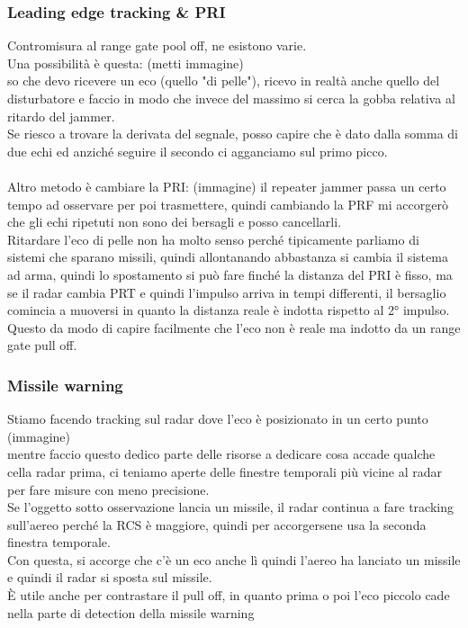 \documentclass[oneside, 12pt]{extbook}
\begin{document}
\subsubsection{Leading edge tracking \& PRI}
Contromisura al range gate pool off, ne esistono varie.\\
Una possibilità è questa: (metti immagine)\\
so che devo ricevere un eco (quello "di pelle"), ricevo in realtà anche quello del disturbatore e faccio in modo che invece del massimo si cerca la gobba relativa al ritardo del jammer.\\
Se riesco a trovare la derivata del segnale, posso capire che è dato dalla somma di due echi ed anziché seguire il secondo ci agganciamo sul primo picco.\\\\
Altro metodo è cambiare la PRI: (immagine) il repeater jammer passa un certo tempo ad osservare per poi trasmettere, quindi cambiando la PRF mi accorgerò che gli echi ripetuti non sono dei bersagli e posso cancellarli.\\
Ritardare l'eco di pelle non ha molto senso perché tipicamente parliamo di sistemi che sparano missili, quindi allontanando abbastanza si cambia il sistema ad arma, quindi lo spostamento si può fare finché la distanza del PRI è fisso, ma se il radar cambia PRT e quindi l'impulso arriva in tempi differenti, il bersaglio comincia a muoversi in quanto la distanza reale è indotta rispetto al 2° impulso.\\
Questo da modo di capire facilmente che l'eco non è reale ma indotto da un range gate pull off.


\subsubsection{Missile warning}
Stiamo facendo tracking sul radar dove l'eco è posizionato in un certo punto (immagine)\\
mentre faccio questo dedico parte delle risorse a dedicare cosa accade qualche cella radar prima, ci teniamo aperte delle finestre temporali più vicine al radar per fare misure con meno precisione.\\
Se l'oggetto sotto osservazione lancia un missile, il radar continua a fare tracking sull'aereo perché la RCS è maggiore, quindi per accorgersene usa la seconda finestra temporale.\\
Con questa, si accorge che c'è un eco anche lì quindi l'aereo ha lanciato un missile e quindi il radar si sposta sul missile.\\
È utile anche per contrastare il pull off, in quanto prima o poi l'eco piccolo cade nella parte di detection della missile warning
\end{document}
